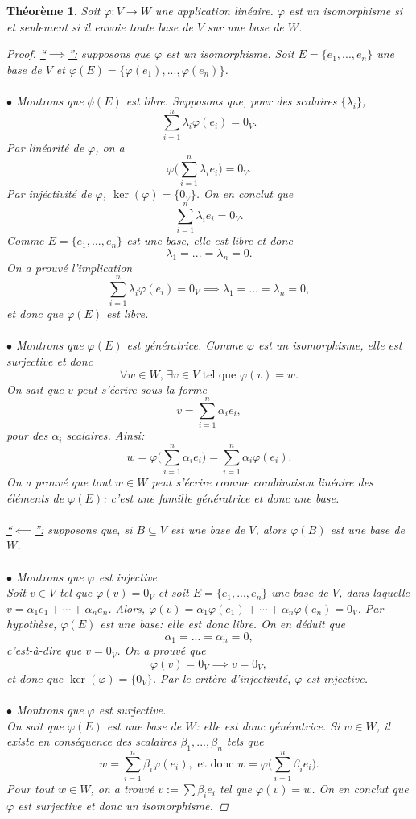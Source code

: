 \documentclass[oneside,12pt,french,table]{book}
\newtheorem{theorem}{Théorème}[section]
\theoremstyle{definition}
\theoremstyle{definition}
\theoremstyle{definition}
\begin{document}
\begin{theorem}
Soit $\varphi: V \longrightarrow W$ une application linéaire. $\varphi$ est un isomorphisme si et seulement si il envoie toute base de $V$ sur une base de $W$.
\begin{proof}
\underline{``$\implies$'':} supposons que $\varphi$ est un isomorphisme. Soit $E= \{e_1,...,e_n\}$ une base de $V$ et $\varphi(E)=\{\varphi(e_1),...,\varphi(e_n)\}$. \\ \\
$\bullet$ Montrons que $\phi(E)$ est libre. Supposons que, pour des scalaires $\{\lambda_i\}$,
$$\sum_{i=1}^{n} \lambda_i \varphi(e_i) = 0_V.$$
Par linéarité de $\varphi$, on a $$\varphi \Bigg(\sum_{i=1}^{n} \lambda_i e_i \Bigg) = 0_V.$$
Par injéctivité de $\varphi$, $\ker(\varphi)= \{0_V\}$. On en conclut que $$\sum_{i=1}^{n} \lambda_i e_i = 0_V.$$
Comme $E = \{e_1,...,e_n\}$ est une base, elle est libre et donc $$\lambda_1 = ... = \lambda_n = 0.$$
On a prouvé l'implication $$\sum_{i=1}^{n} \lambda_i \varphi(e_i) = 0_V \implies \lambda_1 = ... = \lambda_n = 0,$$
et donc que $\varphi(E)$ est libre. \\ \\
$\bullet$ Montrons que $\varphi(E)$ est génératrice. Comme $\varphi$ est un isomorphisme, elle est surjective et donc $$\forall w \in W, \, \exists v \in V \text{ tel que } \varphi(v)=w.$$
On sait que $v$ peut s'écrire sous la forme $$v = \sum_{i=1}^n \alpha_i e_i,$$
pour des $\alpha_i$ scalaires. Ainsi:
$$w = \varphi \Bigg( \sum_{i=1}^n \alpha_i e_i \Bigg) = \sum_{i=1}^n \alpha_i \varphi(e_i).$$
On a prouvé que tout $w \in W$ peut s'écrire comme combinaison linéaire des éléments de $\varphi(E)$: c'est une famille génératrice et donc une base. \\
\\
\underline{``$\impliedby$'':} supposons que, si $B \subseteq V$ est une base de $V$, alors $\varphi(B)$ est une base de $W$. \\ \\
$\bullet$ Montrons que $\varphi$ est injective. \\
Soit $v\in V$ tel que $\varphi(v) = 0_V$ et soit $E = \{e_1,...,e_n\}$ une base de $V$, dans laquelle $v = \alpha_1 e_1 + \cdots + \alpha_n e_n$. Alors, $\varphi(v) = \alpha_1 \varphi(e_1) + \cdots + \alpha_n \varphi(e_n) = 0_V$. Par hypothèse, $\varphi(E)$ est une base: elle est donc libre. On en déduit que
$$\alpha_1 = ... = \alpha_n = 0,$$
c'est-à-dire que $v=0_V$. On a prouvé que $$\varphi(v) = 0_V \implies v=0_V,$$
et donc que $\ker(\varphi) = \{ 0_V \}$. Par le critère d'injectivité, $\varphi$ est injective. \\
\\
$\bullet$ Montrons que $\varphi$ est surjective.\\
On sait que $\varphi(E)$ est une base de $W$: elle est donc génératrice. Si $w \in W$, il existe en conséquence des scalaires $\beta_1,...,\beta_n$ tels que
$$w = \sum_{i=1}^n \beta_i \varphi(e_i), \text{ et donc } w = \varphi \Bigg( \sum_{i=1}^n \beta_i e_i \Bigg).$$
Pour tout $w \in W$, on a trouvé $v := \sum \beta_i e_i$ tel que $\varphi(v)=w$. On en conclut que $\varphi$ est surjective et donc un isomorphisme.
\end{proof}
\end{theorem}
\end{document}
